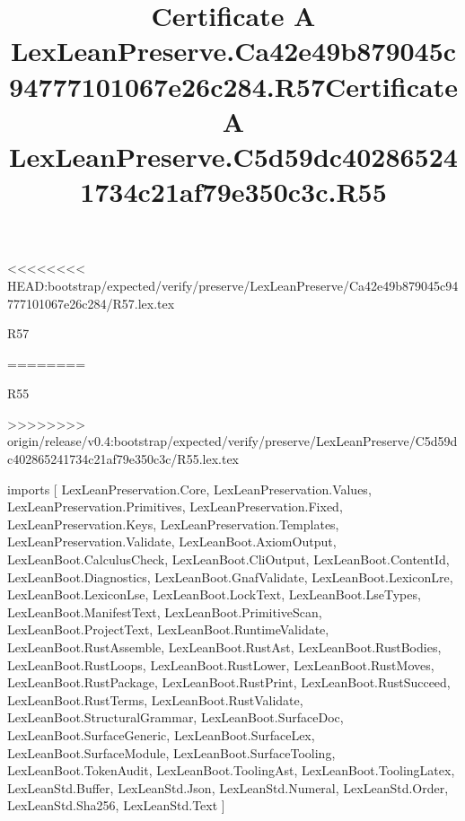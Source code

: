 <<<<<<<< HEAD:bootstrap/expected/verify/preserve/LexLeanPreserve/Ca42e49b879045c94777101067e26c284/R57.lex.tex
\begin{lexlean}{R57}
\title{Certificate A LexLeanPreserve.Ca42e49b879045c94777101067e26c284.R57}
========
\begin{lexlean}{R55}
\title{Certificate A LexLeanPreserve.C5d59dc402865241734c21af79e350c3c.R55}
>>>>>>>> origin/release/v0.4:bootstrap/expected/verify/preserve/LexLeanPreserve/C5d59dc402865241734c21af79e350c3c/R55.lex.tex
\begin{coremodule}
imports [
  LexLeanPreservation.Core,
  LexLeanPreservation.Values,
  LexLeanPreservation.Primitives,
  LexLeanPreservation.Fixed,
  LexLeanPreservation.Keys,
  LexLeanPreservation.Templates,
  LexLeanPreservation.Validate,
  LexLeanBoot.AxiomOutput,
  LexLeanBoot.CalculusCheck,
  LexLeanBoot.CliOutput,
  LexLeanBoot.ContentId,
  LexLeanBoot.Diagnostics,
  LexLeanBoot.GnafValidate,
  LexLeanBoot.LexiconLre,
  LexLeanBoot.LexiconLse,
  LexLeanBoot.LockText,
  LexLeanBoot.LseTypes,
  LexLeanBoot.ManifestText,
  LexLeanBoot.PrimitiveScan,
  LexLeanBoot.ProjectText,
  LexLeanBoot.RuntimeValidate,
  LexLeanBoot.RustAssemble,
  LexLeanBoot.RustAst,
  LexLeanBoot.RustBodies,
  LexLeanBoot.RustLoops,
  LexLeanBoot.RustLower,
  LexLeanBoot.RustMoves,
  LexLeanBoot.RustPackage,
  LexLeanBoot.RustPrint,
  LexLeanBoot.RustSucceed,
  LexLeanBoot.RustTerms,
  LexLeanBoot.RustValidate,
  LexLeanBoot.StructuralGrammar,
  LexLeanBoot.SurfaceDoc,
  LexLeanBoot.SurfaceGeneric,
  LexLeanBoot.SurfaceLex,
  LexLeanBoot.SurfaceModule,
  LexLeanBoot.SurfaceTooling,
  LexLeanBoot.TokenAudit,
  LexLeanBoot.ToolingAst,
  LexLeanBoot.ToolingLatex,
  LexLeanStd.Buffer,
  LexLeanStd.Json,
  LexLeanStd.Numeral,
  LexLeanStd.Order,
  LexLeanStd.Sha256,
  LexLeanStd.Text
]


\end{coremodule}
\end{lexlean}
\end{lexlean}
